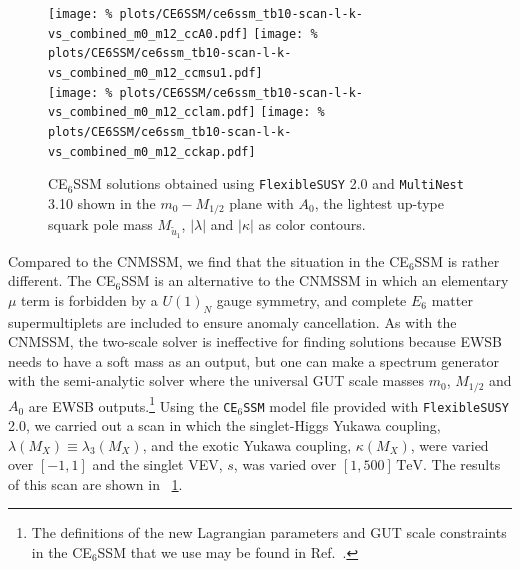 \documentclass[final,3p,11pt,pdflatex]{elsarticle}
\makeatletter
\newcommand{\modelname}[1]{\texttt{#1}\@\xspace}
\newcommand{\fs}{\texttt{FlexibleSUSY}\@\xspace}
\newcommand{\multinest}{\texttt{MultiNest}\@\xspace}
\newcommand{\fstwo}{\fs 2.0\@\xspace}
\newcommand{\ESSM}{E$_6$SSM\@\xspace}
\newcommand{\unit}[1]{\,\text{#1}}      %
\newcommand{\figref}[1]{\figurename~\ref{#1}}
\newcommand{\azero}{\ensuremath{A_0}\xspace}
\newcommand{\mhalf}{\ensuremath{M_{1/2}}\xspace}
\newcommand{\mzero}{\ensuremath{m_0}\xspace}
\makeatother
\begin{document}
\begin{figure}[tbh]
  \centering
  \texttt{[image: \%
    plots/CE6SSM/ce6ssm\_tb10-scan-l-k-vs\_combined\_m0\_m12\_ccA0.pdf]}
   \texttt{[image: \%
    plots/CE6SSM/ce6ssm\_tb10-scan-l-k-vs\_combined\_m0\_m12\_ccmsu1.pdf]} \\
  \texttt{[image: \%
    plots/CE6SSM/ce6ssm\_tb10-scan-l-k-vs\_combined\_m0\_m12\_cclam.pdf]}
   \texttt{[image: \%
    plots/CE6SSM/ce6ssm\_tb10-scan-l-k-vs\_combined\_m0\_m12\_cckap.pdf]}
   \caption{C\ESSM solutions obtained using \fstwo and \multinest 3.10 shown in
     the $\mzero-\mhalf$ plane with $\azero$, the lightest up-type squark pole mass
     $M_{\tilde{u}_1}$,  $|\lambda|$ and $|\kappa|$ as color contours.}
  \label{fig:ce6ssm_solutions}
\end{figure}

Compared to the CNMSSM, we find that the situation in the C\ESSM is rather
different.  The C\ESSM is an alternative to the CNMSSM in which an elementary
$\mu$ term is forbidden by a $U(1)_N$ gauge symmetry, and complete $E_6$ matter
supermultiplets are included to ensure anomaly cancellation.  As with the
CNMSSM, the two-scale solver is ineffective for finding solutions because EWSB
needs to have a soft mass as an output, but one can make a spectrum generator
with the semi-analytic solver where the universal GUT scale masses $\mzero$,
$\mhalf$ and $\azero$ are EWSB outputs.\footnote{The definitions of the
  new Lagrangian parameters and GUT scale constraints in the C\ESSM that we
  use may be found in Ref.~\cite{Athron:2009bs}.}  Using the \modelname{C\ESSM}
model file provided with \fstwo, we carried out a scan in which the
singlet-Higgs Yukawa coupling, $\lambda(M_X) \equiv \lambda_3(M_X)$, and the
exotic Yukawa coupling, $\kappa(M_X)$, were varied over $[-1,1]$ and the singlet
VEV, $s$, was varied over $[1,500] \unit{TeV}$.  The results of this scan are
shown in \figref{fig:ce6ssm_solutions}.
\end{document}
